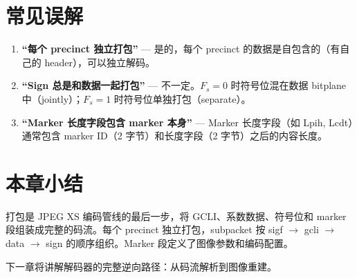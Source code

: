 \section{常见误解}

\begin{misunderstanding}
\begin{enumerate}
  \item \textbf{``每个 precinct 独立打包''} --- 是的，每个 precinct 的数据是自包含的（有自己的 header），可以独立解码。
  \item \textbf{``Sign 总是和数据一起打包''} --- 不一定。$F_s = 0$ 时符号位混在数据 bitplane 中（jointly）；$F_s = 1$ 时符号位单独打包（separate）。
  \item \textbf{``Marker 长度字段包含 marker 本身''} --- Marker 长度字段（如 Lpih, Lcdt）通常包含 marker ID（2 字节）和长度字段（2 字节）之后的内容长度。
\end{enumerate}
\end{misunderstanding}

\section{本章小结}

打包是 JPEG XS 编码管线的最后一步，将 GCLI、系数数据、符号位和 marker 段组装成完整的码流。每个 precinct 独立打包，subpacket 按 sigf $\to$ gcli $\to$ data $\to$ sign 的顺序组织。Marker 段定义了图像参数和编码配置。

下一章将讲解解码器的完整逆向路径：从码流解析到图像重建。
